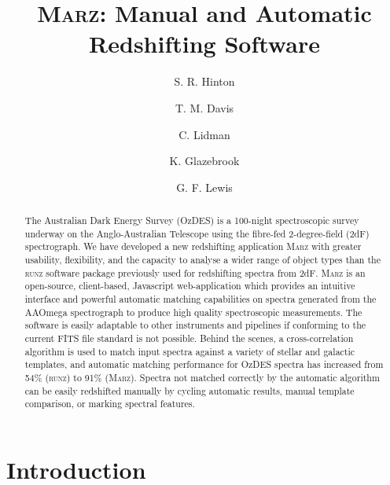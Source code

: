 \documentclass[iop]{emulateapj}
\newcommand{\runz}{\textsc{runz}}
\newcommand{\marz}{\textsc{Marz}}
\begin{document}
\title{\marz{}: Manual and Automatic Redshifting Software}

\author{S. R. Hinton}
\author{T. M. Davis}
\author{C. Lidman}
\author{K. Glazebrook}
\author{G. F. Lewis}

\begin{abstract}
The Australian Dark Energy Survey (OzDES) is a 100-night spectroscopic survey underway on the Anglo-Australian Telescope using the fibre-fed 2-degree-field (2dF) spectrograph.  We have developed a new redshifting application \marz{} with greater usability, flexibility, and the capacity to analyse a wider range of object types than the \runz{} software package previously used for redshifting spectra from 2dF. \marz{} is an open-source, client-based, Javascript web-application which provides an intuitive interface and powerful automatic matching capabilities on spectra generated from the AAOmega spectrograph to produce high quality spectroscopic measurements. The software is easily adaptable to other instruments and pipelines if conforming to the current FITS file standard is not possible. Behind the scenes, a cross-correlation algorithm is used to match input spectra against a variety of stellar and galactic templates, and automatic matching performance for OzDES spectra has increased from 54\% (\runz{}) to 91\% (\marz{}). Spectra not matched correctly by the automatic algorithm can be easily redshifted manually by cycling automatic results, manual template comparison, or marking spectral features.
\end{abstract}

\section{Introduction}
\end{document}
